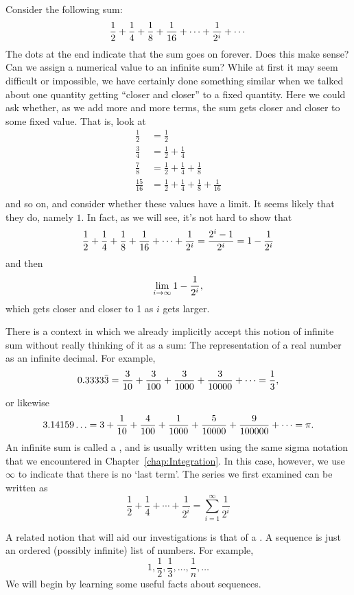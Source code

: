 Consider the following sum:
$${1\over2}+{1\over4}+{1\over8}+{1\over16}+\cdots+{1\over2^i}+\cdots$$
The dots at the end indicate that the sum goes on forever. Does this
make sense? Can we assign a numerical value to an infinite sum? While
at first it may seem difficult or impossible, we have certainly done
something similar when we talked about one quantity getting ``closer
and closer'' to a fixed quantity. Here we could ask whether, as we add
more and more terms, the sum gets closer and closer to some fixed
value. That is, look at
\begin{align*}
\frac{1}{2}&=\frac{1}{2}	\\
\frac{3}{4}&=\frac{1}{2}+\frac{1}{4}	\\
\frac{7}{8}&=\frac{1}{2}+\frac{1}{4}+\frac{1}{8}	\\
\frac{15}{16}&=\frac{1}{2}+\frac{1}{4}+\frac{1}{8}+\frac{1}{16}	\\
\end{align*}
and so on, and consider whether these values have a limit. It seems likely
that they do, namely $1$. In fact, as we will see, it's not hard
to show that 
$${1\over2}+{1\over4}+{1\over8}+{1\over16}+\cdots+{1\over2^i}=
{2^i-1\over2^i}=1-{1\over2^i}$$
and then
$$\lim_{i\to\infty} 1-{1\over2^i},$$
which gets closer and closer to 1 as $i$ gets larger.

There is a context in which we already implicitly accept this notion of infinite
sum without really thinking of it as a sum: The representation of a real number as an infinite decimal. For example,
$$0.3333\bar3 =
{3\over10}+{3\over100}+{3\over1000}+{3\over10000}+\cdots=
{1\over3},$$
or likewise
$$3.14159\ldots = 3+{1\over10}+{4\over100}+{1\over1000}+{5\over10000}+
{9\over100000}+\cdots = \pi.$$
An infinite sum is called a , and is usually written using the same sigma notation that we encountered in Chapter~\ref{chap:Integration}. In this case, however, we use $\infty$ to indicate that there is no `last term'. The series we first examined can be written as
\[\frac{1}{2}+\frac{1}{4}+\cdots+\frac{1}{2^i}=\sum_{i=1}^{\infty}\frac{1}{2^i}\]

A related notion that will aid our investigations is that of a . A sequence is just an ordered (possibly infinite) list of numbers. For example,
\[1,\frac{1}{2},\frac{1}{3},\ldots,\frac{1}{n},\ldots\]
We will begin by learning some useful facts about sequences.
